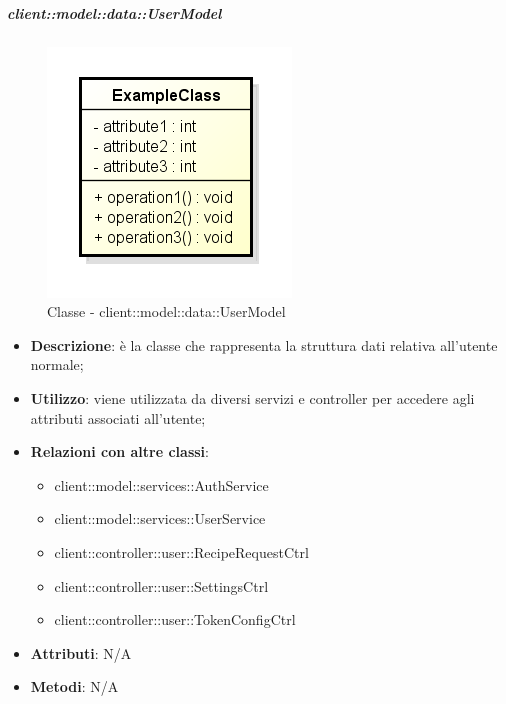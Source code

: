 		\subparagraph{client::model::data::UserModel} %
		\label{subp:client_model_data_user}
			\begin{figure}[htbp]
				\centering
				\centerline{\includegraphics[scale=0.7]{./images/client/classes/example_class.png}}
				\caption{Classe - client::model::data::UserModel}
			\end{figure}
			\begin{itemize}
				\item \textbf{Descrizione}: è la classe che rappresenta la struttura dati relativa all'utente normale;
				\item \textbf{Utilizzo}: viene utilizzata da diversi servizi e controller per accedere agli attributi associati all'utente;
				\item \textbf{Relazioni con altre classi}:
					\begin{itemize}
						\item client::model::services::AuthService
						\item client::model::services::UserService
						\item client::controller::user::RecipeRequestCtrl
						\item client::controller::user::SettingsCtrl
						\item client::controller::user::TokenConfigCtrl
					\end{itemize}
				\item \textbf{Attributi}: N/A
				\item \textbf{Metodi}: N/A
			\end{itemize}

